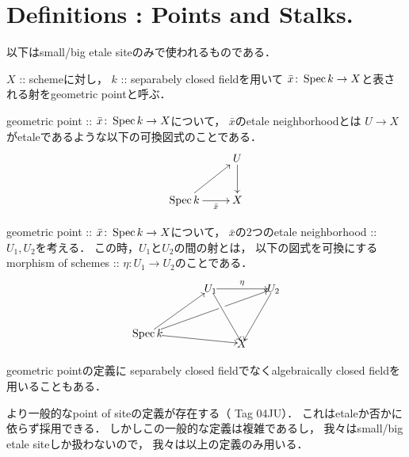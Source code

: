 \documentclass[a4paper]{jsarticle}
\begin{document}
\section{Definitions : Points and Stalks.}
以下はsmall/big etale siteのみで使われるものである．
\begin{Def}
\begin{myenum}{\roman*}
    \item 
    $X$ :: schemeに対し，
    $k$ :: separabely closed fieldを用いて
    $\bar{x} \colon \operatorname{Spec} k \to X$と表される射をgeometric pointと呼ぶ．

    \item
    geometric point :: $\bar{x} \colon \operatorname{Spec} k \to X$について，
    $\bar{x}$のetale neighborhoodとは
    $U \to X$がetaleであるような以下の可換図式のことである．
    \[\xymatrix{
        {} & U \ar[d]\\
        \Spec k \ar[r]_-{\bar{x}} \ar[ru]& X
    }\]

    \item
    geometric point :: $\bar{x} \colon \operatorname{Spec} k \to X$について，
    $\bar{x}$の$2$つのetale neighborhood :: $U_1, U_2$を考える．
    この時，$U_1$と$U_2$の間の射とは，
    以下の図式を可換にするmorphism of schemes :: $\eta \colon U_1 \to U_2$のことである．
    \begin{equation*}
    \begin{xy}
        (0,17.32) *{U_1}="U1", (20, 17.32) *{U_2}="U2",
        (-20, 3) *{\Spec k}="k", (10,0) *{X}="X",
        \ar "U1";"X" \ar "U2";"X" \ar "U1";"U2"^{\eta}
        \ar "k";"U1" \ar|(.59)\hole "k";"U2" \ar "k";"X"
    \end{xy}
    \end{equation*}
\end{myenum}
\end{Def}

\begin{Remark}
    geometric pointの定義に
    separabely closed fieldでなくalgebraically closed fieldを用いることもある．
\end{Remark}

\begin{Remark}
    より一般的なpoint of siteの定義が存在する（\cite{StacksProj} Tag 04JU）．
    これはetaleか否かに依らず採用できる．
    しかしこの一般的な定義は複雑であるし，
    我々はsmall/big etale siteしか扱わないので，
    我々は以上の定義のみ用いる．
\end{Remark}
\end{document}

